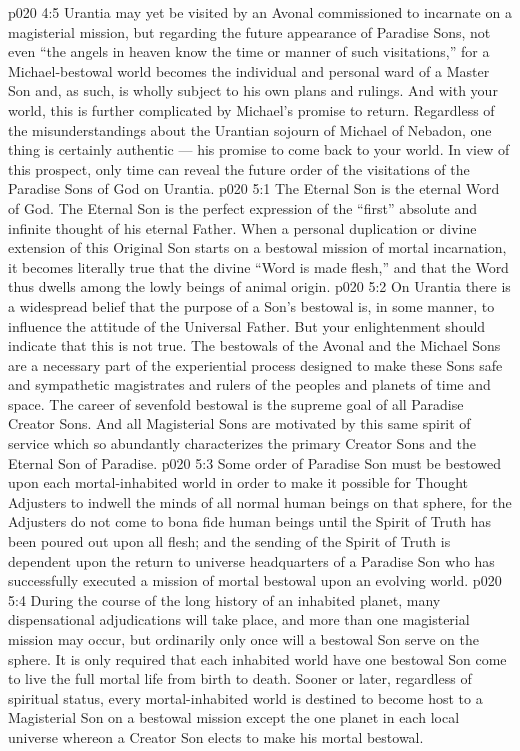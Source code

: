 \vs p020 4:5 Urantia may yet be visited by an Avonal commissioned to incarnate on a magisterial mission, but regarding the future appearance of Paradise Sons, not even “the angels in heaven know the time or manner of such visitations,” for a Michael\hyp{}bestowal world becomes the individual and personal ward of a Master Son and, as such, is wholly subject to his own plans and rulings. And with your world, this is further complicated by Michael’s promise to return. Regardless of the misunderstandings about the Urantian sojourn of Michael of Nebadon, one thing is certainly authentic --- his promise to come back to your world. In view of this prospect, only time can reveal the future order of the visitations of the Paradise Sons of God on Urantia.
\vs p020 5:1 The Eternal Son is the eternal Word of God. The Eternal Son is the perfect expression of the “first” absolute and infinite thought of his eternal Father. When a personal duplication or divine extension of this Original Son starts on a bestowal mission of mortal incarnation, it becomes literally true that the divine “Word is made flesh,” and that the Word thus dwells among the lowly beings of animal origin.
\vs p020 5:2 On Urantia there is a widespread belief that the purpose of a Son’s bestowal is, in some manner, to influence the attitude of the Universal Father. But your enlightenment should indicate that this is not true. The bestowals of the Avonal and the Michael Sons are a necessary part of the experiential process designed to make these Sons safe and sympathetic magistrates and rulers of the peoples and planets of time and space. The career of sevenfold bestowal is the supreme goal of all Paradise Creator Sons. And all Magisterial Sons are motivated by this same spirit of service which so abundantly characterizes the primary Creator Sons and the Eternal Son of Paradise.
\vs p020 5:3 Some order of Paradise Son must be bestowed upon each mortal\hyp{}inhabited world in order to make it possible for Thought Adjusters to indwell the minds of all normal human beings on that sphere, for the Adjusters do not come to  bona fide human beings until the Spirit of Truth has been poured out upon all flesh; and the sending of the Spirit of Truth is dependent upon the return to universe headquarters of a Paradise Son who has successfully executed a mission of mortal bestowal upon an evolving world.
\vs p020 5:4 During the course of the long history of an inhabited planet, many dispensational adjudications will take place, and more than one magisterial mission may occur, but ordinarily only once will a bestowal Son serve on the sphere. It is only required that each inhabited world have one bestowal Son come to live the full mortal life from birth to death. Sooner or later, regardless of spiritual status, every mortal\hyp{}inhabited world is destined to become host to a Magisterial Son on a bestowal mission except the one planet in each local universe whereon a Creator Son elects to make his mortal bestowal.
